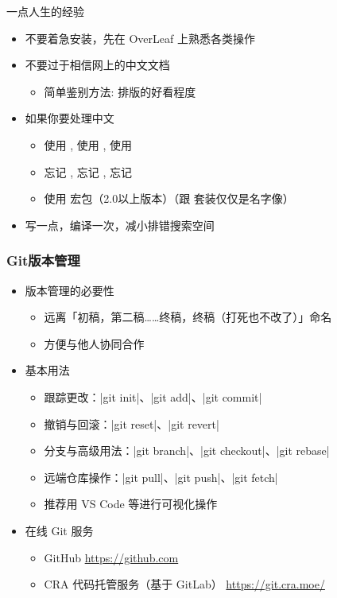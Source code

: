 \begin{frame}{一点人生的经验}
  \begin{itemize}
    \item 不要着急安装，先在 OverLeaf 上熟悉各类操作
    \item 不要过于相信网上的中文文档
      \begin{itemize}
        \item 简单鉴别方法: 排版的好看程度
      \end{itemize}
    \item 如果你要处理中文
      \begin{itemize}
        \item 使用 \XeLaTeX, 使用 \XeLaTeX, 使用 \XeLaTeX
        \item 忘记 , 忘记 , 忘记 
        \item 使用  宏包（2.0以上版本）（跟 \CTeX 套装仅仅是名字像）
      \end{itemize}
    \item 写一点，编译一次，减小排错搜索空间
  \end{itemize}
\end{frame}

\begin{frame}[fragile]
  \frametitle{Git版本管理}
  \begin{itemize}
    \item 版本管理的必要性
      \begin{itemize}
        \item 远离「初稿，第二稿……终稿，终稿（打死也不改了）」命名
        \item 方便与他人协同合作
      \end{itemize}
    \item 基本用法
      \begin{itemize}
        \item 跟踪更改：|git init|、|git add|、|git commit|
        \item 撤销与回滚：|git reset|、|git revert|
        \item 分支与高级用法：|git branch|、|git checkout|、|git rebase|
        \item 远端仓库操作：|git pull|、|git push|、|git fetch|
        \item 推荐用 VS Code 等进行可视化操作
      \end{itemize}
    \item 在线 Git 服务
      \begin{itemize}
        \item GitHub \url{https://github.com}
        \item CRA 代码托管服务（基于 GitLab） \url{https://git.cra.moe/}
      \end{itemize}
  \end{itemize}
  \end{frame}

